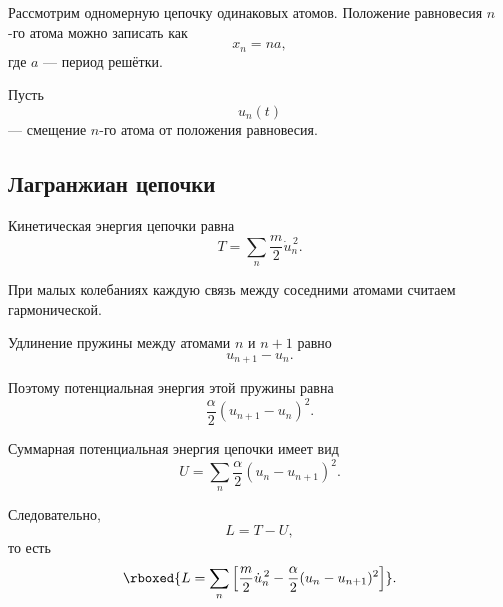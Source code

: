 \documentclass[../final.tex]{subfiles}
\begin{document}
Рассмотрим одномерную цепочку одинаковых атомов.
Положение равновесия $n$-го атома можно записать как
%
\begin{equation*}
    x_n=na,
\end{equation*}
%
где $a$ --- период решётки.

Пусть
%
\begin{equation*}
    u_n(t)
\end{equation*}
%
--- смещение $n$-го атома от положения равновесия.



\subsection*{Лагранжиан цепочки}

Кинетическая энергия цепочки равна
%
\begin{equation*}
    T
    =
    \sum_n
    \frac{m}{2}
    \dot u_n^{\,2}.
\end{equation*}

При малых колебаниях каждую связь между соседними атомами
считаем гармонической.

Удлинение пружины между атомами $n$ и $n+1$ равно
%
\begin{equation*}
    u_{n+1}-u_n.
\end{equation*}

Поэтому потенциальная энергия этой пружины равна
%
\begin{equation*}
    \frac{\alpha}{2}
    (u_{n+1}-u_n)^2.
\end{equation*}

Суммарная потенциальная энергия цепочки имеет вид
%
\begin{equation*}
    U
    =
    \sum_n
    \frac{\alpha}{2}
    (u_n-u_{n+1})^2.
\end{equation*}

Следовательно,
%
\begin{equation*}
    L=T-U,
\end{equation*}
%
то есть
%
\begin{equation*}
    \rboxed{
        L
        =
        \sum_n
        \left[
            \frac{m}{2}\dot u_n^{\,2}
            -
            \frac{\alpha}{2}
            (u_n-u_{n+1})^2
        \right]
    }.
\end{equation*}


\end{document}
